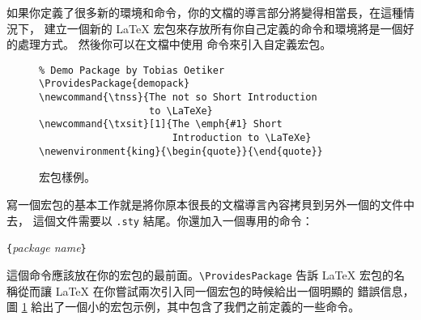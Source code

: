 如果你定義了很多新的環境和命令，你的文檔的導言部分將變得相當長，在這種情況下，
建立一個新的 \LaTeX{} 宏包來存放所有你自己定義的命令和環境將是一個好的處理方式。
然後你可以在文檔中使用  命令來引入自定義宏包。

\begin{figure}[!htbp]
\begin{lined}{\textwidth}
\begin{verbatim}
% Demo Package by Tobias Oetiker
\ProvidesPackage{demopack}
\newcommand{\tnss}{The not so Short Introduction
                   to \LaTeXe}
\newcommand{\txsit}[1]{The \emph{#1} Short
                       Introduction to \LaTeXe}
\newenvironment{king}{\begin{quote}}{\end{quote}}
\end{verbatim}
\end{lined}
\caption{宏包樣例。} \label{package}
\end{figure}

寫一個宏包的基本工作就是將你原本很長的文檔導言內容拷貝到另外一個的文件中去，
 這個文件需要以 \texttt{.sty} 結尾。你還加入一個專用的命令：
\begin{lscommand}
\verb|{|\emph{package name}\verb|}|
\end{lscommand}
\noindent 這個命令應該放在你的宏包的最前面。\verb|\ProvidesPackage| 告訴 \LaTeX{} 
宏包的名稱從而讓 \LaTeX{} 在你嘗試兩次引入同一個宏包的時候給出一個明顯的
錯誤信息，圖 \ref{package} 給出了一個小的宏包示例，其中包含了我們之前定義的一些命令。

